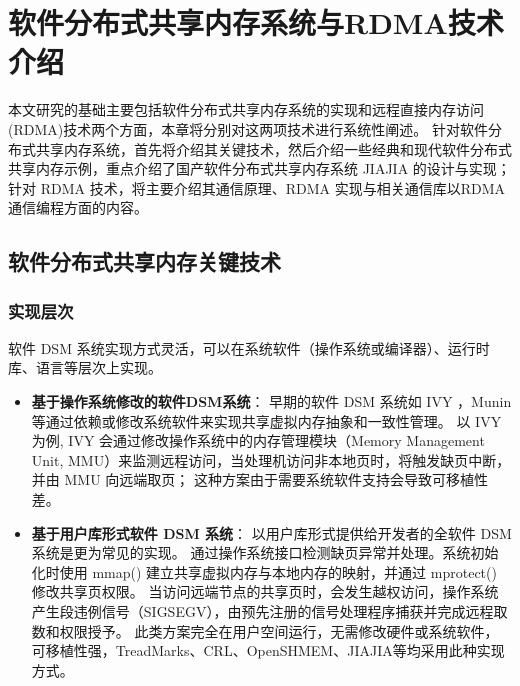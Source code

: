 \chapter{软件分布式共享内存系统与RDMA技术介绍}\label{chap:sdsm}{
    本文研究的基础主要包括软件分布式共享内存系统的实现和远程直接内存访问(RDMA)技术两个方面，本章将分别对这两项技术进行系统性阐述。
    针对软件分布式共享内存系统，首先将介绍其关键技术，然后介绍一些经典和现代软件分布式共享内存示例，重点介绍了国产软件分布式共享内存系统 JIAJIA 的设计与实现；针对 RDMA 技术，将主要介绍其通信原理、RDMA 实现与相关通信库以RDMA通信编程方面的内容。
    \section{软件分布式共享内存关键技术}

    \subsection{实现层次}\label{sec:implementations}
    软件 DSM 系统实现方式灵活，可以在系统软件（操作系统或编译器）、运行时库、语言等层次上实现。
    \begin{itemize}
        \item \textbf{基于操作系统修改的软件DSM系统}：
              早期的软件 DSM 系统如 IVY\citep{likai1988ivy} ，Munin\citep{bennett1990munin}等通过依赖或修改系统软件来实现共享虚拟内存抽象和一致性管理。
              以 IVY 为例, IVY 会通过修改操作系统中的内存管理模块（Memory Management Unit, MMU）来监测远程访问，当处理机访问非本地页时，将触发缺页中断，并由 MMU 向远端取页；
              这种方案由于需要系统软件支持会导致可移植性差。

        \item \textbf{基于用户库形式软件 DSM 系统}：
              以用户库形式提供给开发者的全软件 DSM 系统是更为常见的实现。
              通过操作系统接口检测缺页异常并处理。系统初始化时使用 mmap() 建立共享虚拟内存与本地内存的映射，并通过 mprotect() 修改共享页权限。
              当访问远端节点的共享页时，会发生越权访问，操作系统产生段违例信号（SIGSEGV），由预先注册的信号处理程序捕获并完成远程取数和权限授予。
              此类方案完全在用户空间运行，无需修改硬件或系统软件，可移植性强，TreadMarks、CRL、OpenSHMEM、JIAJIA等均采用此种实现方式。


\end{itemize}}
